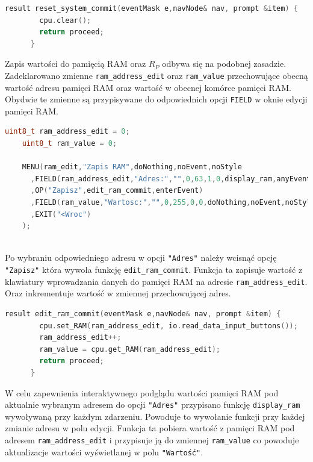 \documentclass[../main.tex]{subfiles}
\begin{document}
\begin{lstlisting}[language=C++]
    result reset_system_commit(eventMask e,navNode& nav, prompt &item) {
        cpu.clear();
        return proceed;
      }
\end{lstlisting}

\par
Zapis wartości do pamięcią RAM oraz $R_P$ odbywa się na podobnej zasadzie. Zadeklarowano zmienne \texttt{ram\_address\_edit} oraz \texttt{ram\_value}
przechowujące obecną wartość adresu pamięci RAM oraz wartość w obecnej komórce pamięci RAM. Obydwie te zmienne są przypisywane
do odpowiednich opcji \texttt{FIELD} w oknie edycji pamięci RAM.

\begin{lstlisting}[language=C++]
    uint8_t ram_address_edit = 0;
    uint8_t ram_value = 0;
    
    MENU(ram_edit,"Zapis RAM",doNothing,noEvent,noStyle
      ,FIELD(ram_address_edit,"Adres:","",0,63,1,0,display_ram,anyEvent,wrapStyle)
      ,OP("Zapisz",edit_ram_commit,enterEvent)
      ,FIELD(ram_value,"Wartosc:","",0,255,0,0,doNothing,noEvent,noStyle)
      ,EXIT("<Wroc")
    );
    
\end{lstlisting}

Po wybraniu odpowiedniego adresu w opcji \texttt{"Adres"} należy wcisnąć opcję \texttt{"Zapisz"} która wywoła funkcję \texttt{edit\_ram\_commit}.
Funkcja ta zapisuje wartość z klawiatury wprowadzania danych do pamięci RAM na adresie \texttt{ram\_address\_edit}. Oraz inkrementuje wartość
w zmiennej przechowującej adres.

\begin{lstlisting}[language=C++]
    result edit_ram_commit(eventMask e,navNode& nav, prompt &item) {
        cpu.set_RAM(ram_address_edit, io.read_data_input_buttons());
        ram_address_edit++;
        ram_value = cpu.get_RAM(ram_address_edit);
        return proceed;
      }
\end{lstlisting}

W celu zapewnienia interaktywnego podglądu wartości pamięci RAM pod aktualnie wybranym adresem do opcji \texttt{"Adres"} przypisano 
funkcję \texttt{display\_ram} wywoływaną przy każdym zdarzeniu. Powoduje to wywołanie funkcji przy każdej zmianie adresu w polu edycji.
Funkcja ta pobiera wartość z pamięci RAM pod adresem \texttt{ram\_address\_edit} i przypisuje ją do zmiennej \texttt{ram\_value} 
co powoduje aktualizacje wartości wyświetlanej w polu \texttt{"Wartość"}.
\end{document}
